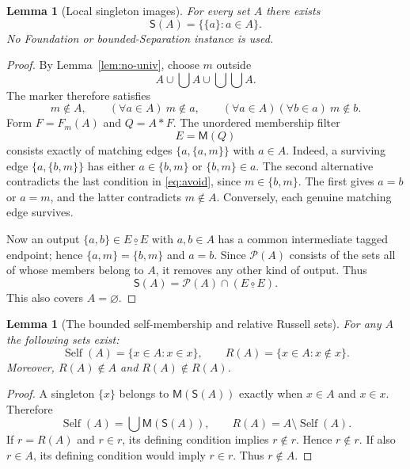 \documentclass[11pt,a4paper]{article}
\numberwithin{equation}{section}
\newtheorem{lemma}[theorem]{Lemma}
\newcommand{\up}[2]{\{#1,#2\}}
\newcommand{\Comp}{\mathbin{\underline{\circ}}}
\newcommand{\UnProd}{\mathbin{\ast}}
\newcommand{\Mem}{\mathsf{M}}
\newcommand{\SI}{\mathsf{S}}
\newcommand{\Pow}{\mathcal P}
\begin{document}
\begin{lemma}[Local singleton images]\label{lem:si}
For every set $A$ there exists
\begin{equation}\label{eq:si}
\SI(A)=\{\{a\}:a\in A\}.
\end{equation}
No Foundation or bounded-Separation instance is used.
\end{lemma}
\begin{proof}
By Lemma~\ref{lem:no-univ}, choose $m$ outside
\[
A\cup\bigcup A\cup\bigcup\bigcup A.
\]
The marker therefore satisfies
\begin{equation}\label{eq:avoid}
m\notin A,\qquad (\forall a\in A)\ m\notin a,
\qquad(\forall a\in A)(\forall b\in a)\ m\notin b.
\end{equation}
Form $F=F_m(A)$ and $Q=A\UnProd F$.  The unordered membership filter
\[
E=\Mem(Q)
\]
consists exactly of matching edges $\up a{\up am}$ with $a\in A$.  Indeed, a surviving edge $\up a{\up bm}$ has either $a\in\up bm$ or $\up bm\in a$.  The second alternative contradicts the last condition in \eqref{eq:avoid}, since $m\in\up bm$.  The first gives $a=b$ or $a=m$, and the latter contradicts $m\notin A$.  Conversely, each genuine matching edge survives.

Now an output $\up ab\in E\Comp E$ with $a,b\in A$ has a common intermediate tagged endpoint; hence $\up am=\up bm$ and $a=b$.  Since $\Pow(A)$ consists of the sets all of whose members belong to $A$, it removes any other kind of output.  Thus
\begin{equation}\label{eq:si-construction}
\SI(A)=\Pow(A)\cap(E\Comp E).
\end{equation}
This also covers $A=\varnothing$.
\end{proof}

\begin{lemma}[The bounded self-membership and relative Russell sets]\label{lem:russell}
For any $A$ the following sets exist:
\[
\operatorname{Self}(A)=\{x\in A:x\in x\},\qquad
R(A)=\{x\in A:x\notin x\}.
\]
Moreover, $R(A)\notin A$ and $R(A)\notin R(A)$.
\end{lemma}
\begin{proof}
A singleton $\{x\}$ belongs to $\Mem(\SI(A))$ exactly when $x\in A$ and $x\in x$.  Therefore
\[
\operatorname{Self}(A)=\bigcup\Mem(\SI(A)),
\qquad R(A)=A\setminus\operatorname{Self}(A).
\]
If $r=R(A)$ and $r\in r$, its defining condition implies $r\notin r$.  Hence $r\notin r$.  If also $r\in A$, its defining condition would imply $r\in r$.  Thus $r\notin A$.
\end{proof}
\end{document}
